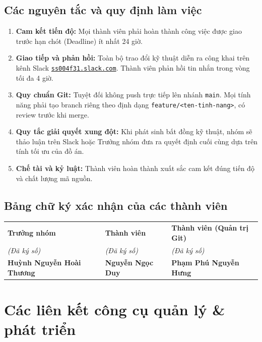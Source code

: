 \documentclass[12pt,a4paper]{article}
\begin{document}
\subsection{Các nguyên tắc và quy định làm việc}
\begin{enumerate}[label=\textbf{Điều \arabic*:}]
    \item \textbf{Cam kết tiến độ:} Mọi thành viên phải hoàn thành công việc được giao trước hạn chót (Deadline) ít nhất 24 giờ.
    \item \textbf{Giao tiếp và phản hồi:} Toàn bộ trao đổi kỹ thuật diễn ra công khai trên kênh Slack \href{https://ss004f31.slack.com}{\texttt{ss004f31.slack.com}}. Thành viên phản hồi tin nhắn trong vòng tối đa 4 giờ.
    \item \textbf{Quy chuẩn Git:} Tuyệt đối không push trực tiếp lên nhánh \texttt{main}. Mọi tính năng phải tạo branch riêng theo định dạng \texttt{feature/<ten-tinh-nang>}, có review trước khi merge.
    \item \textbf{Quy tắc giải quyết xung đột:} Khi phát sinh bất đồng kỹ thuật, nhóm sẽ thảo luận trên Slack hoặc Trưởng nhóm đưa ra quyết định cuối cùng dựa trên tính tối ưu của đồ án.
    \item \textbf{Chế tài và kỷ luật:} Thành viên hoàn thành xuất sắc cam kết đúng tiến độ và chất lượng mã nguồn.
\end{enumerate}

\subsection{Bảng chữ ký xác nhận của các thành viên}
\begin{table}[h!]
\centering
\begin{tabularx}{\textwidth}{XXX}
\textbf{Trưởng nhóm} & \textbf{Thành viên} & \textbf{Thành viên (Quản trị Git)} \\
\textit{(Đã ký số)} & \textit{(Đã ký số)} & \textit{(Đã ký số)} \\[0.6cm]
\textbf{Huỳnh Nguyễn Hoài Thương} & \textbf{Nguyễn Ngọc Duy} & \textbf{Phạm Phú Nguyễn Hưng} \\
\end{tabularx}
\end{table}

\newpage

\section{Các liên kết công cụ quản lý \& phát triển}
\end{document}
